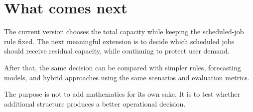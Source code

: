 \documentclass[11pt]{article}
\begin{document}
\begin{center}
\end{center}

\section*{What comes next}

The current version chooses the total capacity while keeping the scheduled-job
rule fixed. The next meaningful extension is to decide which scheduled jobs
should receive residual capacity, while continuing to protect user demand.

After that, the same decision can be compared with simpler rules, forecasting
models, and hybrid approaches using the same scenarios and evaluation metrics.

The purpose is not to add mathematics for its own sake. It is to test whether
additional structure produces a better operational decision.
\end{document}
